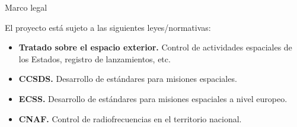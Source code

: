 \begin{frame}{Marco legal}

El proyecto está sujeto a las siguientes leyes/normativas:

\begin{itemize}
\item \textbf{Tratado sobre el espacio exterior.} Control de actividades espaciales de los Estados, registro de lanzamientos, etc. 
\item \textbf{CCSDS.} Desarrollo de estándares para misiones espaciales.
\item \textbf{ECSS.} Desarrollo de estándares para misiones espaciales a nivel europeo.
\item \textbf{CNAF.} Control de radiofrecuencias en el territorio nacional.
\end{itemize}

\end{frame}